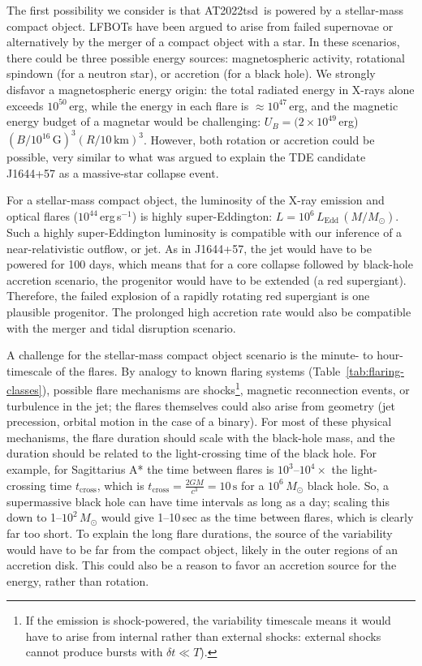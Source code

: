 \documentclass{nature_plusfigure}
\newcommand{\at}{AT2022tsd}
\begin{document}
\begin{methods}
The first possibility we consider is that \at\ is powered by a stellar-mass compact object. LFBOTs have been argued to arise from failed supernovae\cite{Perley2019,Margutti2019} or alternatively by the merger of a compact object with a star\cite{Metzger2022}. In these scenarios, there could be three possible energy sources: magnetospheric activity, rotational spindown (for a neutron star), or accretion (for a black hole). We strongly disfavor a magnetospheric energy origin: the total radiated energy in X-rays alone exceeds $10^{50}\,$erg, while the energy in each flare is $\approx10^{47}\,$erg, and the magnetic energy budget of a magnetar would be challenging: $U_B = (2\times10^{49}\,$erg)$(B/10^{16}\,\mathrm{G})^3 (R/10\,\mathrm{km})^3$. However, both rotation or accretion could be possible, very similar to what was argued to explain the TDE candidate J1644+57 as a massive-star collapse event\cite{Quataert2012}. 

For a stellar-mass compact object, the luminosity of the X-ray emission and optical flares ($10^{44}\,$erg\,s$^{-1}$) is highly super-Eddington: $L=10^{6}\,L_\mathrm{Edd}\,(M/M_\odot)$. Such a highly super-Eddington luminosity is compatible with our inference of a near-relativistic outflow, or jet. As in J1644+57, the jet would have to be powered for 100 days, which means that for a core collapse followed by black-hole accretion scenario, the progenitor would have to be extended (a red supergiant\cite{Quataert2012}). Therefore, the failed explosion of a rapidly rotating red supergiant is one plausible progenitor. The prolonged high accretion rate would also be compatible with the merger and tidal disruption scenario\cite{Metzger2022}.

A challenge for the stellar-mass compact object scenario is the minute- to hour-timescale of the flares. By analogy to known flaring systems (Table~\ref{tab:flaring-classes}), possible flare mechanisms are shocks\footnote{If the emission is shock-powered, the variability timescale means it would have to arise from internal rather than external shocks: external shocks cannot\cite{Kumar2015} produce bursts with $\delta t\ll T$).
}, magnetic reconnection events, or turbulence in the jet; the flares themselves could also arise from geometry (jet precession, orbital motion in the case of a binary). For most of these physical mechanisms, the flare duration should scale with the black-hole mass, and the duration should be related to the light-crossing time of the black hole. 
For example, for Sagittarius A* the time between flares is $10^{3}$--$10^{4}\times$ the light-crossing time $t_\mathrm{cross}$, which is $t_\mathrm{cross}=\frac{2GM}{c^3}=10\,\mathrm{s}$ for a $10^6\,M_\odot$ black hole.
So, a supermassive black hole can have time intervals as long as a day; scaling this down to 1--$10^2\,M_\odot$ would give 1--10\,sec as the time between flares, which is clearly far too short.
To explain the long flare durations, the source of the variability would have to be far from the compact object, likely in the outer regions of an accretion disk\cite{Metzger2022}. This could also be a reason to favor an accretion source for the energy, rather than rotation.


\end{methods}
\end{document}
